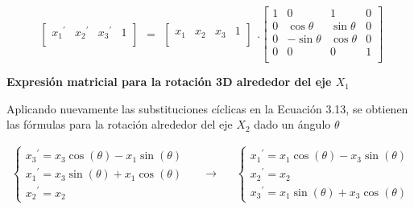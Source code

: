 $$
\begin{array}{rccl}
\left[
\begin{array}{rccl}
{x_{1}}^{\prime} & {x_{2}}^{\prime} & {x_{3}}^{\prime} & 1\\
\end{array}
\right]
\end{array}
=
\begin{array}{rccl}
\left[
\begin{array}{rccl}
x_{1} & x_{2} & x_{3} & 1\\
\end{array}
\right]
\end{array} 
.
\left[
\begin{array}{rccl}
1 & 0 & 1 & 0\\
0 & \cos\theta & \sin\theta &  0\\
0 & -\sin\theta & \cos\theta & 0 \\
0 & 0 & 0 & 1\\
\end{array}
\right]
$$

\begin{center}
\textbf{\footnotesize{Expresión matricial para la rotación 3D alrededor del eje $X_{1}$}}
\end{center}

Aplicando nuevamente las substituciones cíclicas en la Ecuación 3.13, se obtienen las fórmulas para la rotación alrededor del eje $X_{2}$ dado un ángulo $\theta$

\begin{eqfloat}
\begin{equation*}
  \begin{split}
   \begin{cases}
{x_{3}}^{\prime} = x_{3} \cos(\theta) -x_{1} \sin(\theta) \\ 
{x_{1}}^{\prime} = x_{3} \sin(\theta) +x_{1} \cos(\theta) \\
{x_{2}}^{\prime} = x_{2}
\end{cases}
  \end{split}
\quad\longrightarrow\quad
  \begin{split}
   \begin{cases}
   {x_{1}}^{\prime} = x_{1} \cos(\theta) -x_{3} \sin(\theta) \\
   {x_{2}}^{\prime} = x_{2} \\ 
   {x_{3}}^{\prime} = x_{1} \sin(\theta) +x_{3} \cos(\theta)
\end{cases}
\end{split}
\end{equation*}
\end{eqfloat}

